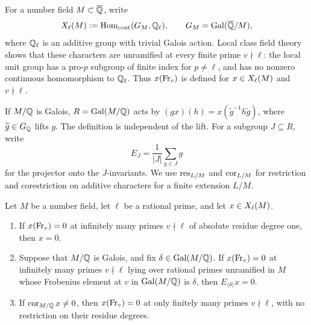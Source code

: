 For a number field $M\subset\overline{\mathbb Q}$, write
\[
 X_{\ell}(M):=\operatorname{Hom}_{\mathrm{cont}}(G_M,\mathbb Q_\ell),
 \qquad G_M=\operatorname{Gal}(\overline{\mathbb Q}/M),
\]
where $\mathbb Q_\ell$ is an additive group with trivial Galois action.
Local class field theory shows that these characters are unramified
at every finite prime $v\nmid\ell$: the local unit group has a
pro-$p$ subgroup of finite index for $p\ne\ell$, and has no
nonzero continuous homomorphism to $\mathbb Q_\ell$.  Thus
$x(\operatorname{Fr}_v)$ is defined for $x\in X_{\ell}(M)$ and $v\nmid\ell$.

If $M/\mathbb Q$ is Galois, $R=\operatorname{Gal}(M/\mathbb Q)$ acts by
$(g x)(h)=x(\widetilde g^{-1}h\widetilde g)$, where
$\widetilde g\in G_\mathbb Q$ lifts $g$.  The definition is independent
of the lift.  For a subgroup $J\subseteq R$, write
\[
 E_J=\frac1{|J|}\sum_{g\in J}g
\]
for the projector onto the $J$-invariants.  We use
$\operatorname{res}_{L/M}$ and $\operatorname{cor}_{L/M}$ for restriction and corestriction
on additive characters for a finite extension $L/M$.

\begin{proposition}\label{prop:character-detection}
Let $M$ be a number field, let $\ell$ be a rational prime, and let
$x\in X_{\ell}(M)$.
\begin{enumerate}
\item[(i)] If $x(\operatorname{Fr}_v)=0$ at infinitely many primes $v\nmid\ell$
of absolute residue degree one, then $x=0$.
\item[(ii)] Suppose that $M/\mathbb Q$ is Galois, and fix
$\delta\in\operatorname{Gal}(M/\mathbb Q)$.  If $x(\operatorname{Fr}_v)=0$ at infinitely many
primes $v\nmid\ell$ lying over rational primes unramified in $M$
whose Frobenius element at $v$ in $\operatorname{Gal}(M/\mathbb Q)$ is $\delta$, then
$E_{\langle\delta\rangle}x=0$.
\item[(iii)] If $\operatorname{cor}_{M/\mathbb Q}x\ne0$, then
$x(\operatorname{Fr}_v)=0$ at only finitely many primes $v\nmid\ell$, with no
restriction on their residue degrees.
\end{enumerate}
\end{proposition}

